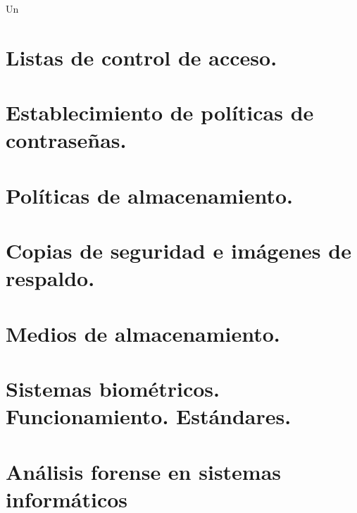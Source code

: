 \documentclass[letterpaper,10pt,spanish]{sphinxmanual}
\begin{document}
Un


\section{Listas de control de acceso.}
\label{\detokenize{tema_pautas_seguridad_informatica/tema_pautas_seguridad_informatica:listas-de-control-de-acceso}}

\section{Establecimiento de políticas de contraseñas.}
\label{\detokenize{tema_pautas_seguridad_informatica/tema_pautas_seguridad_informatica:establecimiento-de-politicas-de-contrasenas}}

\section{Políticas de almacenamiento.}
\label{\detokenize{tema_pautas_seguridad_informatica/tema_pautas_seguridad_informatica:politicas-de-almacenamiento}}

\section{Copias de seguridad e imágenes de respaldo.}
\label{\detokenize{tema_pautas_seguridad_informatica/tema_pautas_seguridad_informatica:copias-de-seguridad-e-imagenes-de-respaldo}}

\section{Medios de almacenamiento.}
\label{\detokenize{tema_pautas_seguridad_informatica/tema_pautas_seguridad_informatica:medios-de-almacenamiento}}

\section{Sistemas biométricos. Funcionamiento. Estándares.}
\label{\detokenize{tema_pautas_seguridad_informatica/tema_pautas_seguridad_informatica:sistemas-biometricos-funcionamiento-estandares}}

\section{Análisis forense en sistemas informáticos}
\label{\detokenize{tema_pautas_seguridad_informatica/tema_pautas_seguridad_informatica:analisis-forense-en-sistemas-informaticos}}
\end{document}

